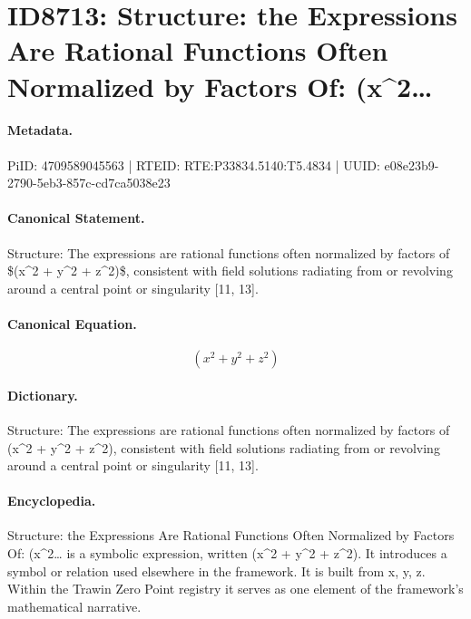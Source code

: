 \section*{ID8713: Structure: the Expressions Are Rational Functions Often Normalized by Factors Of: (x\textasciicircum{}2…}
\paragraph{Metadata.}
PiID: 4709589045563 | RTEID: RTE:P33834.5140:T5.4834 | UUID: e08e23b9-2790-5eb3-857c-cd7ca5038e23

\paragraph{Canonical Statement.}
Structure: The expressions are rational functions often normalized by factors of \$(x\textasciicircum{}2 + y\textasciicircum{}2 + z\textasciicircum{}2)\$, consistent with field solutions radiating from or revolving around a central point or singularity [11, 13].

\paragraph{Canonical Equation.}
\[
(x^2 + y^2 + z^2)
\]

\paragraph{Dictionary.}
Structure: The expressions are rational functions often normalized by factors of (x\textasciicircum{}2 + y\textasciicircum{}2 + z\textasciicircum{}2), consistent with field solutions radiating from or revolving around a central point or singularity [11, 13].

\paragraph{Encyclopedia.}
Structure: the Expressions Are Rational Functions Often Normalized by Factors Of: (x\textasciicircum{}2… is a symbolic expression, written (x\textasciicircum{}2 + y\textasciicircum{}2 + z\textasciicircum{}2). It introduces a symbol or relation used elsewhere in the framework. It is built from x, y, z. Within the Trawin Zero Point registry it serves as one element of the framework's mathematical narrative.
